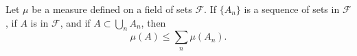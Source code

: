 Let $\mu$ be a measure defined on a field of sets $\mathcal{F}$. If $\{A_n\}$ is a sequence of sets in $\mathcal{F}$, if $A$ is in $\mathcal{F}$, and if $A \subset \bigcup_n A_n$, then
$$\mu(A) \leq \sum_n \mu(A_n).$$
